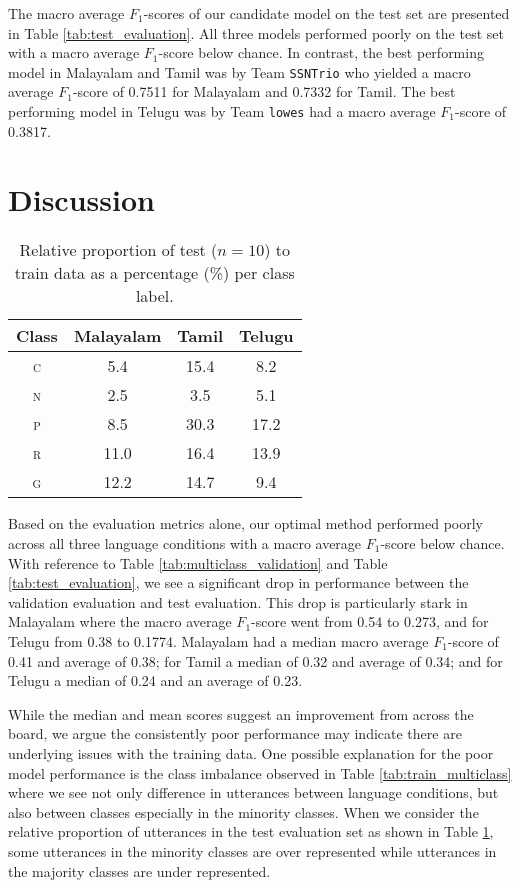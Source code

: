 \documentclass[11pt]{article}
\begin{document}
     The macro average $F_1$-scores of our candidate model on the test set are presented in Table \ref{tab:test_evaluation}. All three models performed poorly on the test set with a macro average $F_1$-score below chance. In contrast, the best performing model in Malayalam and Tamil was by Team \texttt{SSNTrio} who yielded a macro average $F_1$-score of 0.7511 for Malayalam and 0.7332 for Tamil. The best performing model in Telugu was by Team \texttt{lowes} had a macro average $F_1$-score of 0.3817.
 
\section{Discussion}
\label{sec:discussion}

    \begin{table}
        \caption{\label{tab:test_class} Relative proportion of test ($n=10$) to train data as a percentage (\%) per class label.}
        \centering
        \begin{tabular}{cccc}
            \hline
            Class & Malayalam & Tamil & Telugu \\
            \hline
            \textsc{c} & 5.4 & 15.4 & 8.2 \\
            \textsc{n} & 2.5 & 3.5 & 5.1 \\
            \textsc{p} & 8.5 & 30.3 & 17.2 \\
            \textsc{r} & 11.0 & 16.4 & 13.9 \\
            \textsc{g} & 12.2 & 14.7 & 9.4 \\
            \hline
         \end{tabular}
     \end{table}

    Based on the evaluation metrics alone, our optimal method performed poorly across all three language conditions with a macro average $F_1$-score below chance. With reference to Table \ref{tab:multiclass_validation} and Table \ref{tab:test_evaluation}, we see a significant drop in performance between the validation evaluation and test evaluation. This drop is particularly stark in Malayalam where the macro average $F_1$-score went from 0.54 to 0.273, and for Telugu from 0.38 to 0.1774. Malayalam had a median macro average $F_1$-score of 0.41 and average of 0.38; for Tamil a median of 0.32 and average of 0.34; and for Telugu a median of 0.24 and an average of 0.23.
    
    While the median and mean scores suggest an improvement from \citet{chakravarthi_findings_2024} across the board, we argue the consistently poor performance may indicate there are underlying issues with the training data. One possible explanation for the poor model performance is the class imbalance observed in Table \ref{tab:train_multiclass} where we see not only difference in utterances between language conditions, but also between classes especially in the minority classes. When we consider the relative proportion of utterances in the test evaluation set as shown in Table \ref{tab:test_class}, some utterances in the minority classes are over represented while utterances in the majority classes are under represented.
\end{document}
